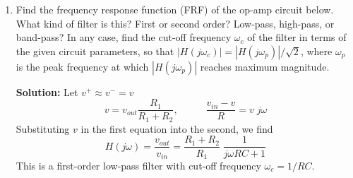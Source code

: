 \begin{enumerate}
\item Find the frequency response function (FRF) of the op-amp circuit 
  below. What kind of filter is this? First or second order? Low-pass, 
  high-pass, or band-pass? In any case, find the cut-off frequency 
  $\omega_c$ of the filter in terms of the given circuit parameters, so
  that $|H(j\omega_c)|=|H(j\omega_p)|/\sqrt{2}$, where $\omega_p$ is the
  peak frequency at which $|H(j\omega_p)|$ reaches maximum magnitude.  


  {\bf Solution:} Let $v^+\approx v^-=v$
  \[
  v=v_{out}\frac{R_1}{R_1+R_2},\;\;\;\;\;\;\;\;\;\;\frac{v_{in}-v}{R}=v\;j\omega
  \]
  Substituting $v$ in the first equation into the second, we find
  \[
  H(j\omega)=\frac{v_{out}}{v_{in}}=\frac{R_1+R_2}{R_1}\;\frac{1}{j\omega RC+1}
  \]
  This is a first-order low-pass filter with cut-off frequency $\omega_c=1/RC$.


\end{enumerate}


